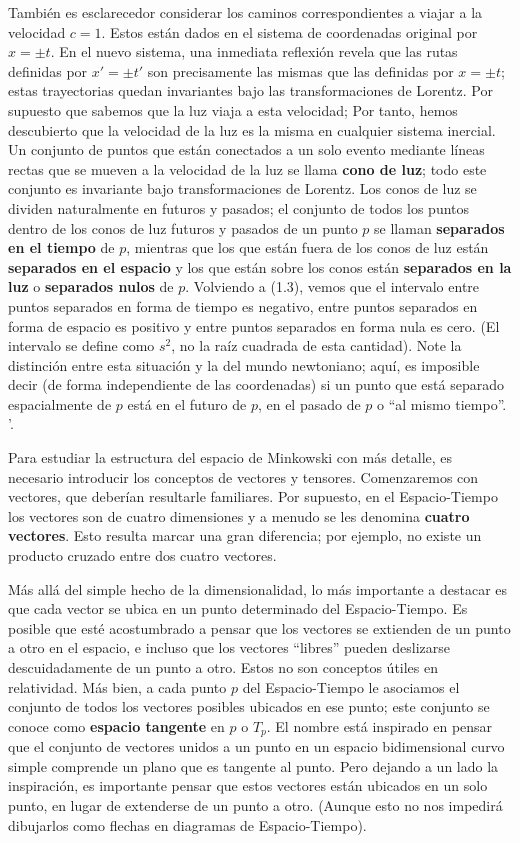 \documentclass[11pt,b5paper,openany,twoside]{book}
\begin{document}
También es esclarecedor considerar los caminos correspondientes a viajar a la velocidad $c=1$.
Estos están dados en el sistema de coordenadas original por $x=\pm t$.
En el nuevo sistema, una inmediata reflexión revela que las rutas definidas por $x' = \pm t'$ son precisamente las mismas que las definidas por $x=\pm t$; estas trayectorias quedan invariantes bajo las transformaciones de Lorentz.
Por supuesto que sabemos que la luz viaja a esta velocidad; Por tanto, hemos descubierto que la velocidad de la luz es la misma en cualquier sistema inercial.
Un conjunto de puntos que están conectados a un solo evento mediante líneas rectas que se mueven a la velocidad de la luz se llama {\bf cono de luz}; todo este conjunto es invariante bajo transformaciones de Lorentz.
Los conos de luz se dividen naturalmente en futuros y pasados; el conjunto de todos los puntos dentro de los conos de luz futuros y pasados de un punto $p$ se llaman {\bf separados en el tiempo} de $p$, mientras que los que están fuera de los conos de luz están {\bf separados en el espacio} y los que están sobre los conos están {\bf separados en la luz} o {\bf separados nulos} de $p$.
Volviendo a (1.3), vemos que el intervalo entre puntos separados en forma de tiempo es negativo, entre puntos separados en forma de espacio es positivo y entre puntos separados en forma nula es cero.
(El intervalo se define como $s^2$, no la raíz cuadrada de esta cantidad).
Note la distinción entre esta situación y la del mundo newtoniano; aquí, es imposible decir (de forma independiente de las coordenadas) si un punto que está separado espacialmente de $p$ está en el futuro de $p$, en el pasado de $p$ o ``al mismo tiempo''. '.

Para estudiar la estructura del espacio de Minkowski con más detalle, es necesario introducir los conceptos de vectores y tensores.
Comenzaremos con vectores, que deberían resultarle familiares.
Por supuesto, en el Espacio-Tiempo los vectores son de cuatro dimensiones y a menudo se les denomina {\bf cuatro vectores}.
Esto resulta marcar una gran diferencia; por ejemplo, no existe un producto cruzado entre dos cuatro vectores.

Más allá del simple hecho de la dimensionalidad, lo más importante a destacar es que cada vector se ubica en un punto determinado del Espacio-Tiempo.
Es posible que esté acostumbrado a pensar que los vectores se extienden de un punto a otro en el espacio, e incluso que los vectores ``libres'' pueden deslizarse descuidadamente de un punto a otro.
Estos no son conceptos útiles en relatividad.
Más bien, a cada punto $p$ del Espacio-Tiempo le asociamos el conjunto de todos los vectores posibles ubicados en ese punto; este conjunto se conoce como {\bf espacio tangente} en $p$ o $T_p$.
El nombre está inspirado en pensar que el conjunto de vectores unidos a un punto en un espacio bidimensional curvo simple comprende un plano que es tangente al punto.
Pero dejando a un lado la inspiración, es importante pensar que estos vectores están ubicados en un solo punto, en lugar de extenderse de un punto a otro.
(Aunque esto no nos impedirá dibujarlos como flechas en diagramas de Espacio-Tiempo).
\end{document}
